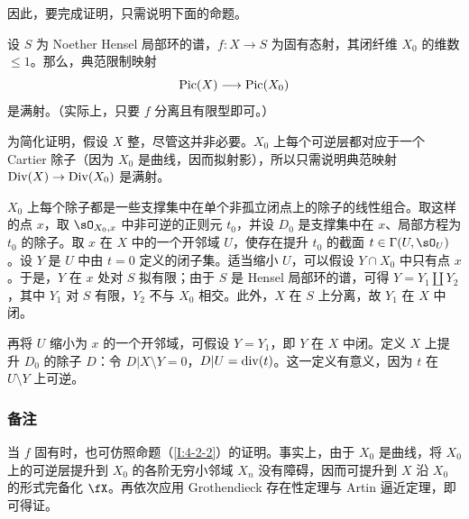 因此，要完成证明，只需说明下面的命题。
\begin{proposition}\label{I:4-4-1}
设 $S$ 为 Noether Hensel 局部环的谱，$f:X\to S$ 为固有态射，其闭纤维 $X_0$ 的维数 $\leqslant1$。那么，典范限制映射
\[
\operatorname{Pic}(X)\longrightarrow\operatorname{Pic}(X_0)
\]
是满射。（实际上，只要 $f$ 分离且有限型即可。）
\end{proposition}
为简化证明，假设 $X$ 整，尽管这并非必要。$X_0$ 上每个可逆层都对应于一个 Cartier 除子（因为 $X_0$ 是曲线，因而拟射影），所以只需说明典范映射 $\operatorname{Div}(X)\to\operatorname{Div}(X_0)$ 是满射。

$X_0$ 上每个除子都是一些支撑集中在单个非孤立闭点上的除子的线性组合。取这样的点 $x$，取 $\sO_{X_0,x}$ 中非可逆的正则元 $t_0$，并设 $D_0$ 是支撑集中在 $x$、局部方程为 $t_0$ 的除子。取 $x$ 在 $X$ 中的一个开邻域 $U$，使存在提升 $t_0$ 的截面 $t\in\Gamma(U,\sO_U)$。设 $Y$ 是 $U$ 中由 $t=0$ 定义的闭子集。适当缩小 $U$，可以假设 $Y\cap X_0$ 中只有点 $x$。于是，$Y$ 在 $x$ 处对 $S$ 拟有限；由于 $S$ 是 Hensel 局部环的谱，可得 $Y=Y_1\amalg Y_2$，其中 $Y_1$ 对 $S$ 有限，$Y_2$ 不与 $X_0$ 相交。此外，$X$ 在 $S$ 上分离，故 $Y_1$ 在 $X$ 中闭。

再将 $U$ 缩小为 $x$ 的一个开邻域，可假设 $Y=Y_1$，即 $Y$ 在 $X$ 中闭。定义 $X$ 上提升 $D_0$ 的除子 $D$：令 $D|X\setminus Y=0$，$D|U=\operatorname{div}(t)$。这一定义有意义，因为 $t$ 在 $U\setminus Y$ 上可逆。
\subsubsection{备注}\label{I:4-4-2}
当 $f$ 固有时，也可仿照命题（\ref{I:4-2-2}）的证明。事实上，由于 $X_0$ 是曲线，将 $X_0$ 上的可逆层提升到 $X_0$ 的各阶无穷小邻域 $X_n$ 没有障碍，因而可提升到 $X$ 沿 $X_0$ 的形式完备化 $\fX$。再依次应用 Grothendieck 存在性定理与 Artin 逼近定理，即可得证。

